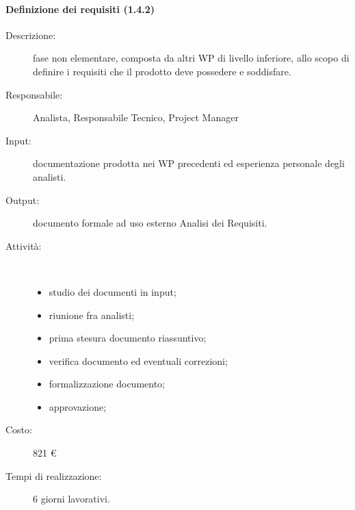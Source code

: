 \paragraph{Definizione dei requisiti (1.4.2)}
\begin{description}
\item[Descrizione:] fase non elementare, composta da altri WP di livello inferiore, allo scopo di definire i requisiti che il prodotto deve possedere e soddisfare.
\item[Responsabile:] Analista, Responsabile Tecnico, Project Manager
\item[Input:] documentazione prodotta nei WP precedenti ed esperienza personale degli analisti.
\item[Output:] documento formale ad uso esterno Analisi dei Requisiti.
\item[Attività:]\mbox{}\\[-1.5\baselineskip]
	\begin{itemize}
	\item studio dei documenti in input;
	\item riunione fra analisti;
	\item prima stesura documento riassuntivo;
	\item verifica documento ed eventuali correzioni;
	\item formalizzazione documento;
	\item approvazione;
	\end{itemize}
\item[Costo:] 821 \euro{}
\item[Tempi di realizzazione:] 6 giorni lavorativi.
\end{description}

